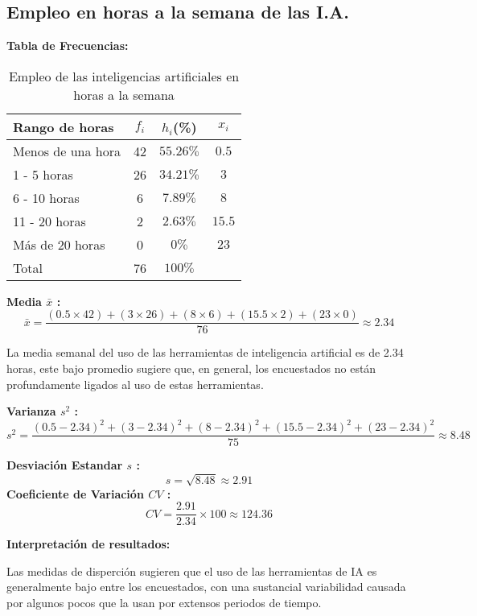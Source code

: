 \subsection{Empleo en horas a la semana de las I.A.}
\textbf{Tabla de Frecuencias:} \\

\begin{table}[h!]
	\centering
	\renewcommand{\arraystretch}{1.5} 
	\begin{tabular}{l c c c }
		\hline
		{Rango de horas} & {\(f_i\)} & \textit{\(h_i\)}(\%) & \textit{\(x_i\)}\\
		\hline
		Menos de una hora	& 42 & \(55.26\%\) & \(0.5\)	\\
		1 - 5 horas			& 26 & \(34.21\%\) & \(3\)		\\
		6 - 10 horas 		& 6  & \(7.89\%\)  & \(8\)		\\
		11 - 20 horas 		& 2  & \(2.63\%\)  & \(15.5\)	\\
		Más de 20 horas		& 0  & \(0\%\)     & \(23\)		\\
		\hline
		Total				& 76 & \(100\%\) \\
		\hline
	\end{tabular}
	\caption{Empleo de las inteligencias artificiales en horas a la semana}
	\label{tabla:EmpleoEnHoras}
\end{table}

\textbf{Media $\bar{x}$ :}
\begin{equation*}
	\bar{x} = \frac{(0.5 \times 42) + (3 \times 26) + (8 \times 6) + (15.5 \times 2) + (23 \times 0)}{76} \approx 2.34
\end{equation*}

La media semanal del uso de las herramientas de inteligencia artificial es de 2.34 horas, este bajo promedio sugiere que, en general, los encuestados no están profundamente ligados al uso de estas herramientas.

\textbf{Varianza $s^2$ :}
\begin{equation*}
	s^2 = \frac{(0.5 - 2.34)^2 + (3 - 2.34)^2 + (8 - 2.34)^2 + (15.5 - 2.34)^2 + (23 - 2.34)^2}{75} \approx 8.48
\end{equation*}

\begin{multicols}{2}
	\textbf{Desviación Estandar $s$ :}
	\begin{equation*}
		s = \sqrt{8.48} \approx 2.91
	\end{equation*}
	\textbf{Coeficiente de Variación $CV$ :}
	\begin{equation*}
		CV = \frac{2.91}{2.34} \times 100 \approx 124.36
	\end{equation*}  
\end{multicols}

\textbf{Interpretación de resultados:}

Las medidas de disperción sugieren que el uso de las herramientas de IA es generalmente bajo entre los encuestados, con una sustancial variabilidad causada por algunos pocos que la usan por extensos periodos de tiempo.